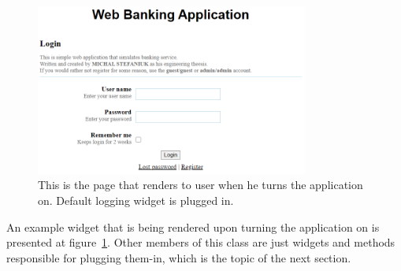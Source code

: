 \documentclass[a4paper,12pt]{book}
\begin{document}
{\begin{figure}[H]
\centering
\includegraphics[width=0.8\textwidth]{logpage}
\caption{This is the page that renders to user when he turns the application on. Default logging widget is plugged in.}
\label{fig:loginpage}
\end{figure}  

An example widget that is being rendered upon turning the application on is presented at figure~\ref{fig:loginpage}. Other members of this class are just widgets and methods responsible for plugging them-in, which is the topic of the next section.
}
\end{document}
